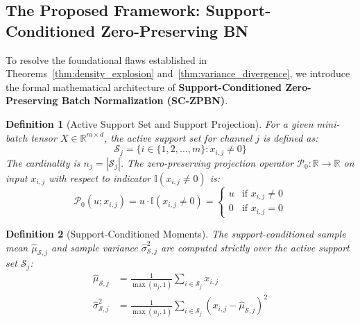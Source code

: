 \documentclass[twocolumn,10pt]{article}
\newtheorem{definition}{Definition}
\begin{document}
\subsection{The Proposed Framework: Support-Conditioned Zero-Preserving BN}

To resolve the foundational flaws established in Theorems~\ref{thm:density_explosion} and~\ref{thm:variance_divergence}, we introduce the formal mathematical architecture of \textbf{Support-Conditioned Zero-Preserving Batch Normalization (SC-ZPBN)}.

\begin{definition}[Active Support Set and Support Projection]
For a given mini-batch tensor $X \in \mathbb{R}^{m \times d}$, the active support set for channel $j$ is defined as:
\begin{equation}
\mathcal{S}_j = \{i \in \{1, 2, \dots, m\} : x_{i,j} \neq 0\}
\end{equation}
The cardinality is $n_j = |\mathcal{S}_j|$. The zero-preserving projection operator $\mathcal{P}_0: \mathbb{R} \to \mathbb{R}$ on input $x_{i,j}$ with respect to indicator $\mathbb{I}(x_{i,j} \neq 0)$ is:
\begin{equation}
\mathcal{P}_0(u; x_{i,j}) = u \cdot \mathbb{I}(x_{i,j} \neq 0) = \begin{cases} u & \text{if } x_{i,j} \neq 0 \\ 0 & \text{if } x_{i,j} = 0 \end{cases}
\end{equation}
\end{definition}

\begin{definition}[Support-Conditioned Moments]
The support-conditioned sample mean $\hat{\mu}_{\mathcal{S}, j}$ and sample variance $\hat{\sigma}_{\mathcal{S}, j}^2$ are computed strictly over the active support set $\mathcal{S}_j$:
\begin{align}
\hat{\mu}_{\mathcal{S}, j} &= \frac{1}{\max(n_j, 1)} \sum_{i \in \mathcal{S}_j} x_{i,j} \label{eq:sc_mean} \\
\hat{\sigma}_{\mathcal{S}, j}^2 &= \frac{1}{\max(n_j, 1)} \sum_{i \in \mathcal{S}_j} (x_{i,j} - \hat{\mu}_{\mathcal{S}, j})^2 \label{eq:sc_var}
\end{align}
\end{definition}
\end{document}
